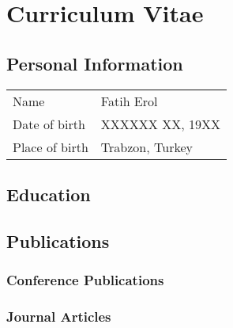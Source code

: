 

\chapter*{Curriculum Vitae}


\section*{Personal Information}
\vspace{-5pt}
\begin{table}[h] %
\begin{tabular}{@{} p{2.25cm} p{}}
Name            & Fatih Erol \\
Date of birth   & XXXXXX XX, 19XX \\
Place of birth  & Trabzon, Turkey
\end{tabular}
\end{table}
\vspace{-10pt}


\section*{Education}
\vspace{-5pt}


\section*{Publications}
\subsection*{Conference Publications}
\subsection*{Journal Articles}
